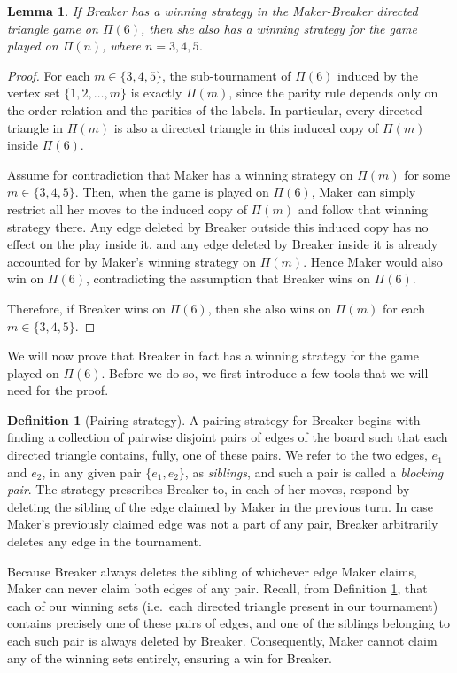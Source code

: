 \documentclass{article}
\theoremstyle{definition}
\newtheorem{defi}{Definition}[section]
\theoremstyle{plain}
\newtheorem{lem}[theo]{Lemma}
\theoremstyle{remark}
\theoremstyle{definition}
\begin{document}
\begin{lem} \label{lem: breaker monotonicity}
If Breaker has a winning strategy in the Maker-Breaker directed triangle game on $\Pi(6)$, then she also has a winning strategy for the game played on $\Pi(n)$, where $n=3,4,5$.
\end{lem}
\begin{proof}
For each $m\in\{3,4,5\}$, the sub-tournament of $\Pi(6)$ induced by the vertex set $\{1,2,\dots,m\}$ is exactly $\Pi(m)$, since the parity rule depends only on the order relation and the parities of the labels. In particular, every directed triangle in $\Pi(m)$ is also a directed triangle in this induced copy of $\Pi(m)$ inside $\Pi(6)$.

Assume for contradiction that Maker has a winning strategy on $\Pi(m)$ for some $m\in\{3,4,5\}$. Then, when the game is played on $\Pi(6)$, Maker can simply restrict all her moves to the induced copy of $\Pi(m)$ and follow that winning strategy there. Any edge deleted by Breaker outside this induced copy has no effect on the play inside it, and any edge deleted by Breaker inside it is already accounted for by Maker's winning strategy on $\Pi(m)$. Hence Maker would also win on $\Pi(6)$, contradicting the assumption that Breaker wins on $\Pi(6)$.

Therefore, if Breaker wins on $\Pi(6)$, then she also wins on $\Pi(m)$ for each $m\in\{3,4,5\}$.

\end{proof}

We will now prove that Breaker in fact has a winning strategy for the game played on $\Pi(6)$. Before we do so, we first introduce a few tools that we will need for the proof.

\begin{defi}[Pairing strategy]\label{defi:pairingstrategy}
    A pairing strategy for Breaker begins with finding a collection of pairwise disjoint pairs of edges of the board such that each directed triangle contains, fully, one of these pairs. We refer to the two edges, $e_{1}$ and $e_{2}$, in any given pair $\{e_1,e_2\}$, as \emph{siblings}, and such a pair is called a \emph{blocking pair}. The strategy prescribes Breaker to, in each of her moves, respond by deleting the sibling of the edge claimed by Maker in the previous turn. In case Maker's previously claimed edge was not a part of any pair, Breaker arbitrarily deletes any edge in the tournament. 
\end{defi}
Because Breaker always deletes the sibling of whichever edge Maker claims, Maker can never claim both edges of any pair. Recall, from Definition \ref{defi:pairingstrategy}, that each of our winning sets (i.e.\ each directed triangle present in our tournament) contains precisely one of these pairs of edges, and one of the siblings belonging to each such pair is always deleted by Breaker. Consequently, Maker cannot claim any of the winning sets entirely, ensuring a win for Breaker. 
\end{document}
